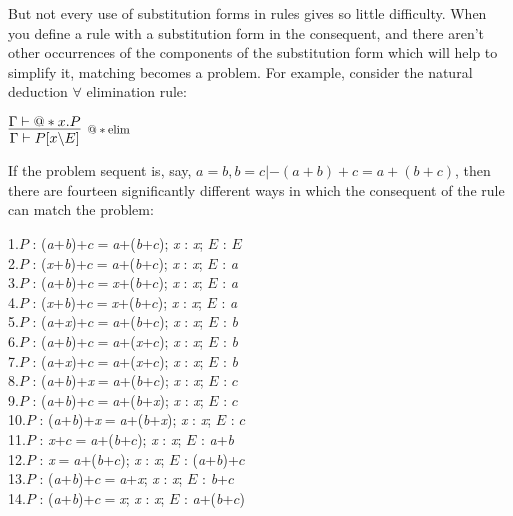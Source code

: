 But not every use of substitution forms in rules gives so little difficulty. When you define a rule with a substitution form in the consequent, and there aren't other occurrences of the components of the substitution form which will help to simplify it, matching becomes a problem. For example, consider the natural deduction \ensuremath{\forall} elimination rule:


$\infer[\reason{$@*\operatorname{elim}$}]
       {\Gamma  |- P[x\backslash E]}
       {\Gamma  |- @*x.P}$

If the problem sequent is, say, $a=b,b=c |- (a+b)+c=a+(b+c)$, then there are fourteen significantly different ways in which the consequent of the rule can match the problem:

1.\tab $P$ : (\textit{a}+\textit{b})+$c$\ensuremath{=}\textit{a}+(\textit{b}+$c$); \textit{x} : \textit{x}; $E$ : $E$\\
2.\tab $P$ : (\textit{x}+\textit{b})+$c$\ensuremath{=}\textit{a}+(\textit{b}+$c$); \textit{x} : \textit{x}; $E$ : \textit{a}\\
3.\tab $P$ : (\textit{a}+\textit{b})+$c$\ensuremath{=}\textit{x}+(\textit{b}+$c$); \textit{x} : \textit{x}; $E$ : \textit{a}\\
4.\tab $P$ : (\textit{x}+\textit{b})+$c$\ensuremath{=}\textit{x}+(\textit{b}+$c$); \textit{x} : \textit{x}; $E$ : \textit{a}\\
5.\tab $P$ : (\textit{a}+\textit{x})+$c$\ensuremath{=}\textit{a}+(\textit{b}+$c$); \textit{x} : \textit{x}; $E$ : \textit{b}\\
6.\tab $P$ : (\textit{a}+\textit{b})+$c$\ensuremath{=}\textit{a}+(\textit{x}+$c$); \textit{x} : \textit{x}; $E$ : \textit{b}\\
7.\tab $P$ : (\textit{a}+\textit{x})+$c$\ensuremath{=}\textit{a}+(\textit{x}+$c$); \textit{x} : \textit{x}; $E$ : \textit{b}\\
8.\tab $P$ : (\textit{a}+\textit{b})+\textit{x}\ensuremath{=}\textit{a}+(\textit{b}+$c$); \textit{x} : \textit{x}; $E$ : $c$\\
9.\tab $P$ : (\textit{a}+\textit{b})+$c$\ensuremath{=}\textit{a}+(\textit{b}+\textit{x}); \textit{x} : \textit{x}; $E$ : $c$\\
10.\tab $P$ : (\textit{a}+\textit{b})+\textit{x}\ensuremath{=}\textit{a}+(\textit{b}+\textit{x}); \textit{x} : \textit{x}; $E$ : $c$\\
11.\tab $P$ : \textit{x}+$c$\ensuremath{=}\textit{a}+(\textit{b}+$c$); \textit{x} : \textit{x}; $E$ : \textit{a}+\textit{b}\\
12.\tab $P$ : \textit{x}\ensuremath{=}\textit{a}+(\textit{b}+$c$); \textit{x} : \textit{x}; $E$ : (\textit{a}+\textit{b})+$c$\\
13.\tab $P$ : (\textit{a}+\textit{b})+$c$\ensuremath{=}\textit{a}+\textit{x}; \textit{x} : \textit{x}; $E$ : \textit{b}+$c$\\
14.\tab $P$ : (\textit{a}+\textit{b})+$c$\ensuremath{=}\textit{x}; \textit{x} : \textit{x}; $E$ : \textit{a}+(\textit{b}+$c$)


